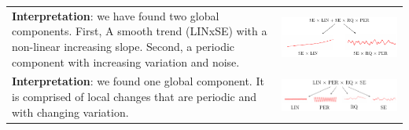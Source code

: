 \documentclass[a0,portrait]{a0poster}
\begin{document}
\begin{multicols}{3}
\begin{center}
\begin{tabular}{m{12cm} m{12cm}}
{\bf Interpretation}: we have found two global components. First, A smooth trend (LINxSE) with a non-linear increasing slope. Second, a periodic component with increasing variation and noise. &\includegraphics[width=\linewidth]{airline_struct_1.pdf}\\
{\bf Interpretation}: we found one global component. It is comprised of local changes that are periodic and with changing variation. &\includegraphics[width=\linewidth]{airline_struct_2.pdf}

\end{tabular}
\end{center}






 



\end{multicols}
\end{document}
